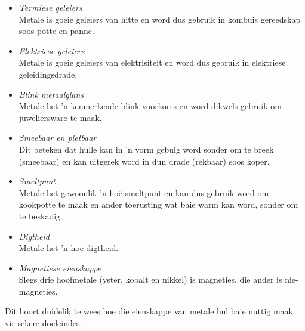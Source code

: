         \label{m38708*id65732}\begin{itemize}[noitemsep]
            \label{m38708*uid77}\item \textsl{Termiese geleiers} \\
       Metale is goeie geleiers van hitte en word dus gebruik in kombuis gereedskap soos potte en panne.
\label{m38708*uid78}\item \textsl{Elektriese geleiers} \\
       Metale is goeie geleiers van elektrisiteit en word dus gebruik in elektriese geleidingsdrade.
\label{m38708*uid79}\item \textsl{Blink metaalglans} \\
       Metale het 'n kenmerkende blink voorkoms en word dikwels gebruik om juweliersware te maak.
\label{m38708*uid80}\item \textsl{Smeebaar en pletbaar} \\
       Dit beteken dat hulle kan in  'n vorm gebuig word sonder om te breek (smeebaar) en kan uitgerek word in dun drade
      (rekbaar) soos koper.
\label{m38708*uid81}\item \textsl{Smeltpunt} \\
       Metale het gewoonlik 'n hoë smeltpunt en kan dus gebruik word om kookpotte te maak 
      en ander toerusting wat baie warm kan word, sonder om te beskadig.
\label{m38708*uid82}\item \textsl{Digtheid} \\
       Metale het 'n hoë digtheid.
\item \textsl{Magnetiese eienskappe} \\ 
       Slegs drie hoofmetale (yster, kobalt en nikkel) is magneties, die ander is nie-magneties.
\end{itemize}
         \label{m38708*id65852}Dit hoort duidelik te wees hoe die eienskappe van metale hul baie nuttig maak vir sekere doeleindes.\par 
\label{m38708*secfhsst!!!underscore!!!id320} 
